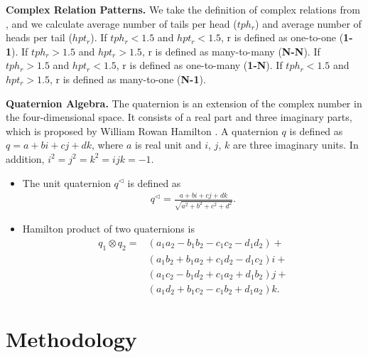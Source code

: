 \documentclass[10pt, a4paper]{article}
\begin{document}
\textbf{Complex Relation Patterns.} We take the definition of complex relations from \citet{81wang2014knowledge}, and we calculate average number of tails per head ($tph_r$) and average number of heads per tail ($hpt_r$). If $tph_r<1.5 $ and $hpt_r <1.5 $, r is defined as one-to-one (\textbf{1-1}). If $tph_r > 1.5$ and $hpt_r> 1.5$, r is defined as many-to-many (\textbf{N-N}). If $tph_r>1.5 $ and $hpt_r < 1.5 $, r is defined as one-to-many (\textbf{1-N}). If $tph_r<1.5 $ and $hpt_r > 1.5 $, r is defined as many-to-one (\textbf{N-1}).

\textbf{Quaternion Algebra.} The quaternion is an extension of the complex number in the four-dimensional space. It consists of a real part and three imaginary parts, which is proposed by William Rowan Hamilton \cite{34hamilton1844theory}.
A quaternion $q$ is defined as $q=a+bi+cj+dk$, where $a$ is real unit and $i$, $j$, $k$ are three imaginary units. In addition, $i^2=j^2=k^2=ijk=-1$.


\begin{itemize}
	\item The unit quaternion $q^\vartriangleleft $ is defined as
	      \begin{align}
		      q^\vartriangleleft=\frac{a+bi+cj+dk}{\sqrt{a^2+b^2+c^2+d^2}}.
	      \end{align}

	\item Hamilton product of two quaternions is
	      \begin{equation}\label{eq2}
		      \begin{split}
			      q_1\otimes q_2 = &(a_1a_2-b_1b_2-c_1c_2-d_1d_2)+\\
			      &(a_1b_2+b_1a_2+c_1d_2-d_1c_2)i+\\
			      &(a_1c_2-b_1d_2+c_1a_2+d_1b_2)j+\\
			      &(a_1d_2+b_1c_2-c_1b_2+d_1a_2)k.
		      \end{split}
	      \end{equation}
\end{itemize}


\section{Methodology}
\end{document}
